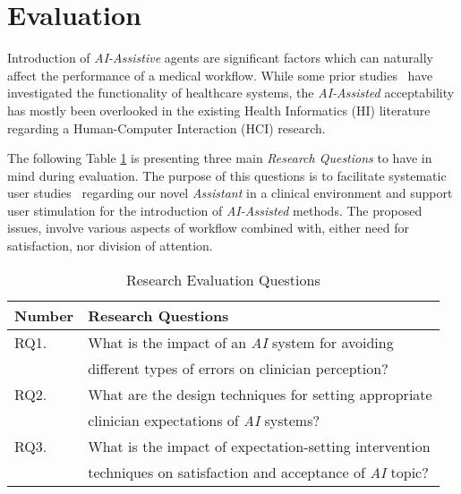 
\section{Evaluation}
\label{sec:sec006}

Introduction of \textit{AI-Assistive} agents are significant factors which can naturally affect the performance of a medical workflow. While some prior studies~\cite{Calisto:2017:TTM:3132272.3134111, calistobreastscreening, calisto2017mimbcdui} have investigated the functionality of healthcare systems, the \textit{AI-Assisted} acceptability has mostly been overlooked in the existing Health Informatics (HI) literature regarding a Human-Computer Interaction (HCI) research.

The following Table \ref{table:usability_evaluation_questions} is presenting three main \textit{Research Questions} to have in mind during evaluation. The purpose of this questions is to facilitate systematic user studies~\cite{oliveiraadaptive} regarding our novel \textit{Assistant} in a clinical environment and support user stimulation for the introduction of \textit{AI-Assisted} methods. The proposed issues, involve various aspects of workflow combined with, either need for satisfaction, nor division of attention.

\hfill

\begin{table}[h]
\centering
\begin{tabular}{l|l}
Number & Research Questions                             	              \\ \hline
RQ1.   & What is the impact of an {\it AI} system for avoiding        \\
       & different types of errors on clinician perception?           \\ \hline
RQ2.   & What are the design techniques for setting appropriate       \\
       & clinician expectations of {\it AI} systems?                  \\ \hline
RQ3.   & What is the impact of expectation-setting intervention       \\
       & techniques on satisfaction and acceptance of {\it AI} topic? \\ \hline

\end{tabular}
\caption{Research Evaluation Questions}
\label{table:usability_evaluation_questions}
\end{table}

